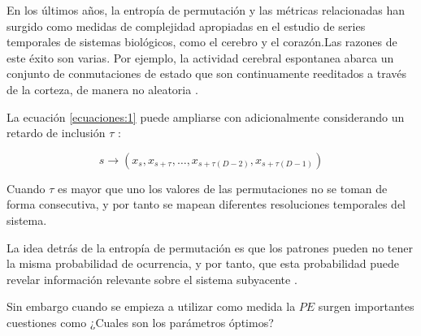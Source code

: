 En los últimos años, la entropía de permutación y las métricas relacionadas han surgido como medidas de complejidad apropiadas en el estudio de series temporales de sistemas biológicos, como el cerebro y el corazón.Las razones de este éxito son varias. Por ejemplo, la actividad cerebral espontanea abarca un conjunto de conmutaciones de estado que son continuamente reeditados a través de la corteza, de manera no aleatoria \cite{pe1}.

La ecuación \ref{ecuaciones:1} puede ampliarse con adicionalmente considerando un retardo de inclusión $\tau$ :

$$s \rightarrow (x_{s},x_{s+\tau},\dots,x_{s+\tau(D-2)}, x_{s+\tau(D-1)})$$\label{ecuaciones:2}

Cuando $\tau$ es mayor que uno los valores de las permutaciones no se toman de forma consecutiva, y por tanto se mapean diferentes resoluciones temporales del sistema.

La idea detrás de la entropía de permutación es que los patrones pueden no tener la misma probabilidad de ocurrencia, y por tanto, que esta probabilidad puede revelar información relevante sobre el sistema subyacente \cite{pe1}.

Sin embargo cuando se empieza a utilizar como medida la $PE$ surgen importantes cuestiones como ¿Cuales son los parámetros óptimos?
